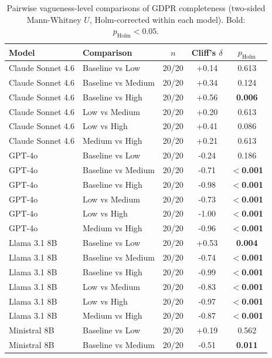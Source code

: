 \begin{table}[t]
  \centering
  \caption{Pairwise vagueness-level comparisons of GDPR completeness (two-sided Mann-Whitney $U$, Holm-corrected within each model). Bold: $p_{\text{Holm}} < 0.05$.}
  \label{tab:gdpr_significance}
  \begin{tabular}{llccc}
    \toprule
    Model & Comparison & $n$ & Cliff's $\delta$ & $p_{\text{Holm}}$ \\
    \midrule
    Claude Sonnet 4.6 & Baseline vs Low & 20/20 & +0.14 & 0.613 \\
    Claude Sonnet 4.6 & Baseline vs Medium & 20/20 & +0.34 & 0.124 \\
    Claude Sonnet 4.6 & Baseline vs High & 20/20 & +0.56 & \textbf{0.006} \\
    Claude Sonnet 4.6 & Low vs Medium & 20/20 & +0.20 & 0.613 \\
    Claude Sonnet 4.6 & Low vs High & 20/20 & +0.41 & 0.086 \\
    Claude Sonnet 4.6 & Medium vs High & 20/20 & +0.21 & 0.613 \\
    GPT-4o & Baseline vs Low & 20/20 & -0.24 & 0.186 \\
    GPT-4o & Baseline vs Medium & 20/20 & -0.71 & \textbf{$<$0.001} \\
    GPT-4o & Baseline vs High & 20/20 & -0.98 & \textbf{$<$0.001} \\
    GPT-4o & Low vs Medium & 20/20 & -0.73 & \textbf{$<$0.001} \\
    GPT-4o & Low vs High & 20/20 & -1.00 & \textbf{$<$0.001} \\
    GPT-4o & Medium vs High & 20/20 & -0.96 & \textbf{$<$0.001} \\
    Llama 3.1 8B & Baseline vs Low & 20/20 & +0.53 & \textbf{0.004} \\
    Llama 3.1 8B & Baseline vs Medium & 20/20 & -0.74 & \textbf{$<$0.001} \\
    Llama 3.1 8B & Baseline vs High & 20/20 & -0.99 & \textbf{$<$0.001} \\
    Llama 3.1 8B & Low vs Medium & 20/20 & -0.83 & \textbf{$<$0.001} \\
    Llama 3.1 8B & Low vs High & 20/20 & -0.97 & \textbf{$<$0.001} \\
    Llama 3.1 8B & Medium vs High & 20/20 & -0.87 & \textbf{$<$0.001} \\
    Ministral 8B & Baseline vs Low & 20/20 & +0.19 & 0.562 \\
    Ministral 8B & Baseline vs Medium & 20/20 & -0.51 & \textbf{0.011} \\

\end{tabular}
\end{table}
